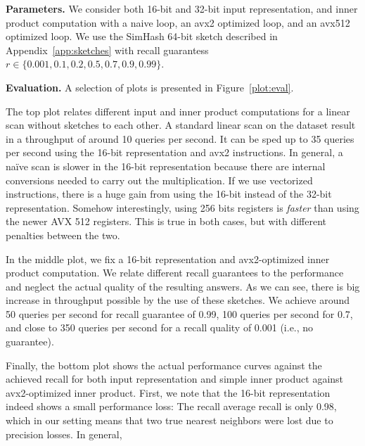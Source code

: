 \documentclass{llncs}
\newcommand{\myparagraph}[1]{\noindent \textbf{#1}}
\begin{document}
\myparagraph{Parameters.} We consider both 16-bit and 32-bit input representation, and inner product computation with a naive loop, an avx2 optimized loop, and an avx512 optimized loop. We use the SimHash 64-bit sketch described in Appendix~\ref{app:sketches} with recall guarantess $r \in \{0.001, 0.1, 0.2, 0.5, 0.7, 0.9, 0.99\}$. 

\myparagraph{Evaluation.} A selection of plots is presented in Figure~\ref{plot:eval}. 

The top plot relates different input and inner product computations for a linear scan without sketches to each other. A standard linear scan on the dataset result in a throughput of around 10 queries per second. It can be sped up to 35 queries per second using the 16-bit representation and avx2 instructions. In general, a naïve scan is slower in the 16-bit representation because there are internal conversions needed to carry out the multiplication. If we use vectorized instructions, there is a huge gain from using the 16-bit instead of the 32-bit representation. Somehow interestingly, using 256 bits registers is \emph{faster} than using the newer AVX 512 registers. This is true in both cases, but with different penalties between the two.

In the middle plot, we fix a 16-bit representation and avx2-optimized inner product computation. 
We relate different recall guarantees to the performance and neglect the actual quality of the resulting answers.
As we can see, there is big increase in throughput possible by the use of these sketches. We achieve around 50 queries per second for recall guarantee of 0.99, 100 queries per second for 0.7, and close to 350 queries per second for a recall quality of 0.001 (i.e., no guarantee). 

Finally, the bottom plot shows the actual performance curves against the achieved recall for both input representation and simple inner product against avx2-optimized inner product. 
First, we note that the 16-bit representation indeed shows a small performance loss: The recall average recall is only 0.98, which in our setting means that two true nearest neighbors were lost due to precision losses. 
In general, 
\end{document}
